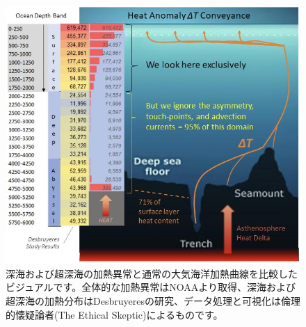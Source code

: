 \documentclass[10pt,twocolumn,letterpaper]{article}
\begin{document}
\begin{figure}[t]
\begin{center}

\includegraphics[width=1\textwidth]{deepsea.jpg}
\end{center}
   \caption{深海および超深海の加熱異常と通常の大気海洋加熱曲線を比較したビジュアルです。全体的な加熱異常はNOAAより取得\cite{147}、深海および超深海の加熱分布はDesbruyeresの研究\cite{132}、データ処理と可視化は倫理的懐疑論者(The Ethical Skeptic)によるものです\cite{129}。}
\label{fig:21}
\end{figure}
\end{document}
